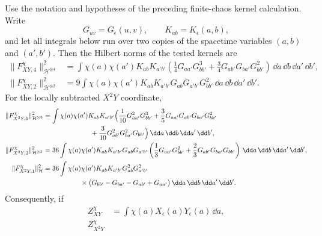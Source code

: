 \begin{proposition}
\label{prop:spde-nonlinear-negative-coordinate-kernel-norms}
Use the notation and hypotheses of the preceding finite-chaos kernel
calculation.
Write
\[
  G_{uv}=G_\epsilon(u,v),\qquad
  K_{ab}=K_\epsilon(a,b),
\]
and let all integrals below run over two copies of the spacetime variables
\((a,b)\) and \((a',b')\).  Then the Hilbert norms of the tested kernels are
\begin{equation}
\begin{aligned}
  \|F_{XY,4}^{\chi}\|_{\mathcal H^{\otimes4}}^2
  &=
  \int\chi(a)\chi(a')K_{ab}K_{a'b'}
  \left(
     \frac14G_{aa'}G_{bb'}^3
    +\frac34G_{ab'}G_{ba'}G_{bb'}^2
  \right)\,\dd a\,\dd b\,\dd a'\,\dd b',\\
  \|F_{XY,2}^{\chi}\|_{\mathcal H^{\otimes2}}^2
  &=
  9\int\chi(a)\chi(a')K_{ab}K_{a'b'}G_{ab}G_{a'b'}G_{bb'}^2
  \,\dd a\,\dd b\,\dd a'\,\dd b'.
\end{aligned}
  \label{eq:spde-xy-kernel-norm-integrals}
\end{equation}
For the locally subtracted \(X^2Y\) coordinate,
\begin{equation}
\begin{aligned}
  \|F_{X^2Y,5}^{\chi}\|_{\mathcal H^{\otimes5}}^2
  &=
  \int\chi(a)\chi(a')K_{ab}K_{a'b'}
  \Bigl(
    \frac1{10}G_{aa'}^2G_{bb'}^3
    +\frac35G_{aa'}G_{ab'}G_{ba'}G_{bb'}^2\\
  &\hspace{7.0em}
    +\frac3{10}G_{ab'}^2G_{ba'}^2G_{bb'}
  \Bigr)\,\dd a\,\dd b\,\dd a'\,\dd b',\\
  \|F_{X^2Y,3}^{\chi}\|_{\mathcal H^{\otimes3}}^2
  &=
  36\int\chi(a)\chi(a')K_{ab}K_{a'b'}G_{ab}G_{a'b'}
  \left(
    \frac13G_{aa'}G_{bb'}^2
    +\frac23G_{ab'}G_{ba'}G_{bb'}
  \right)\,\dd a\,\dd b\,\dd a'\,\dd b',\\
  \|F_{X^2Y,1}^{\chi}\|_{\mathcal H}^2
  &=
  36\int\chi(a)\chi(a')K_{ab}K_{a'b'}G_{ab}^2G_{a'b'}^2\\
  &\hspace{5.5em}\times
  \bigl(
    G_{bb'}-G_{ba'}-G_{ab'}+G_{aa'}
  \bigr)\,\dd a\,\dd b\,\dd a'\,\dd b'.
\end{aligned}
  \label{eq:spde-x2y-kernel-norm-integrals}
\end{equation}
Consequently, if
\[
\begin{aligned}
  Z_{XY}^{\chi}
  &=
  \int\chi(a)X_\epsilon(a)Y_\epsilon(a)\,\dd a,\\
  Z_{X^2Y}^{\chi}

\end{aligned}\]
\end{proposition}
